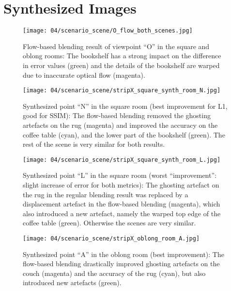\chapter{Synthesized Images}\label{imgs}

\begin{figure}
		\centering
    \texttt{[image: 04/scenario\_scene/O\_flow\_both\_scenes.jpg]}
		\caption[Flow-based blending results of ``O'']{Flow-based blending result of viewpoint ``O'' in the square and oblong rooms: The bookshelf has a strong impact on the difference in error values (green) and the details of the bookshelf are warped due to inaccurate optical flow (magenta).}
		\label{fig:scene_O_flow}
\end{figure}

\begin{figure}
  \centering
  \texttt{[image: 04/scenario\_scene/stripX\_square\_synth\_room\_N.jpg]}
  \caption[Viewpoint ``N'' in the square room]{Synthesized point ``N'' in the square room (best improvement for L1, good for SSIM): The flow-based blending removed the ghosting artefacts on the rug (magenta) and improved the accuracy on the coffee table (cyan), and the lower part of the bookshelf (green). The rest of the scene is very similar for both results.}
  \label{fig:scene_square_N}
\end{figure}

\begin{figure}
  \centering
  \texttt{[image: 04/scenario\_scene/stripX\_square\_synth\_room\_L.jpg]}
  \caption[Viewpoint ``L'' in the square room]{Synthesized point ``L'' in the square room (worst ``improvement'': slight increase of error for both metrics): The ghosting artefact on the rug in the regular blending result was replaced by a displacement artefact in the flow-based blending (magenta), which also introduced a new artefact, namely the warped top edge of the coffee table (green). Otherwise the scenes are very similar.}
  \label{fig:scene_square_L}
\end{figure}

\begin{figure}
  \centering
  \texttt{[image: 04/scenario\_scene/stripX\_oblong\_room\_A.jpg]}
  \caption[Viewpoint ``A'' in the oblong room]{Synthesized point ``A'' in the oblong room (best improvement): The flow-based blending drastically improved ghosting artefacts on the couch (magenta) and the accuracy of the rug (cyan), but also introduced new artefacts (green).}
  \label{fig:scene_oblong_A}
\end{figure}

